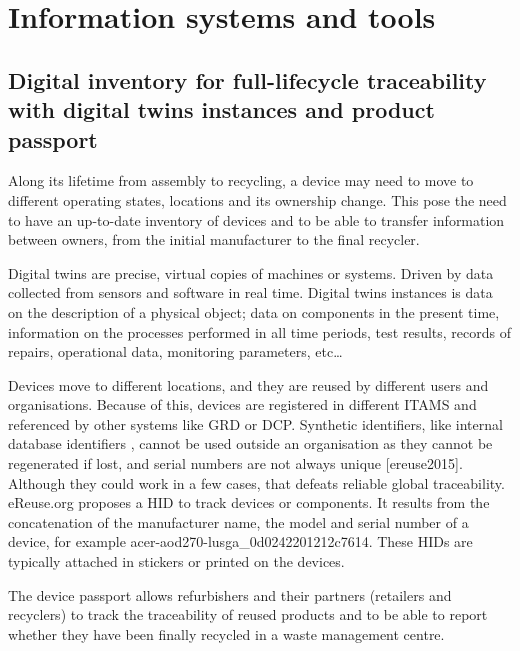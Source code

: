 \documentclass[
]{book}
\begin{document}
\hypertarget{information-systems-and-tools}{%
\section{Information systems and tools}\label{information-systems-and-tools}}

\hypertarget{digital-inventory-for-full-lifecycle-traceability-with-digital-twins-instances-and-product-passport}{%
\subsection{Digital inventory for full-lifecycle traceability with digital twins instances and product passport}\label{digital-inventory-for-full-lifecycle-traceability-with-digital-twins-instances-and-product-passport}}

Along its lifetime from assembly to recycling, a device may need to move to different operating states, locations and its ownership change. This pose the need to have an up-to-date inventory of devices and to be able to transfer information between owners, from the initial manufacturer to the final recycler.

Digital twins are precise, virtual copies of machines or systems. Driven by data collected from sensors and software in real time. Digital twins instances is data on the description of a physical object; data on components in the present time, information on the processes performed in all time periods, test results, records of repairs, operational data, monitoring parameters, etc\ldots{}

Devices move to different locations, and they are reused by different users and organisations. Because of this, devices are registered in different ITAMS and referenced by other systems like GRD or DCP. Synthetic identifiers, like internal database identifiers \citep{Waltermire2011}, cannot be used outside an organisation as they cannot be regenerated if lost, and serial numbers are not always unique {[}ereuse2015{]}. Although they could work in a few cases, that defeats reliable global traceability. eReuse.org proposes a HID to track devices or components. It results from the concatenation of the manufacturer name, the model and serial number of a device, for example acer-aod270-lusga\_0d0242201212c7614. These HIDs are typically attached in stickers or printed on the devices.

The device passport allows refurbishers and their partners (retailers and recyclers) to track the traceability of reused products and to be able to report whether they have been finally recycled in a waste management centre.
\end{document}
